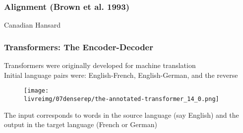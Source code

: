 \begin{frame}[fragile]
\frametitle{Alignment (Brown et al. 1993)}
\color{structure}
Canadian Hansard
 
\begin{center}

\end{center}
\vspace{0.75cm}
\begin{center}

\end{center}
\end{frame}

\begin{frame}[fragile]
\frametitle{Transformers: The Encoder-Decoder}\color{structure}
Transformers were originally developed for machine translation\\
Initial language pairs were: English-French, English-German, and the reverse\\

\begin{figure}[tb]
\begin{center}
 \texttt{[image: \\livreimg/07denserep/the-annotated-transformer\_14\_0.png]}
\end{center}
\end{figure}
The input corresponds to words in the source language (say English) and the output in the target language (French or German)
\end{frame}



